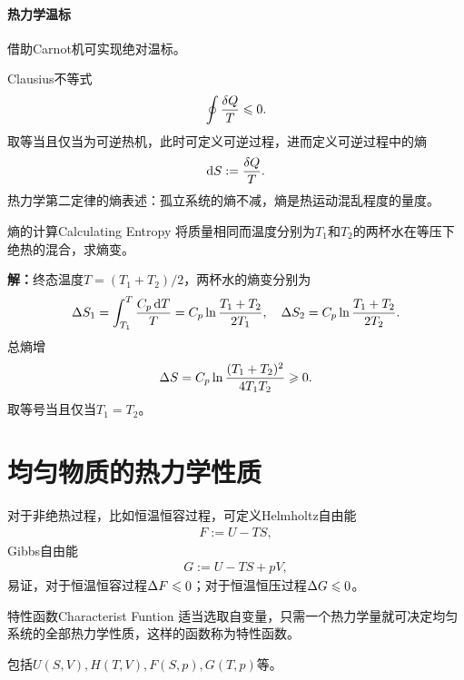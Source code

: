 \paragraph*{热力学温标}借助Carnot机可实现绝对温标。

Clausius不等式
\begin{align}
	\oint\frac{\mathop{}\!\delta Q}T\leqslant 0.
\end{align}
取等当且仅当为可逆热机，此时可定义可逆过程，进而定义可逆过程中的熵
\begin{align}
	\mathop{}\!\mathrm{d} S:=\frac{\mathop{}\!\delta Q}T.
\end{align}
热力学第二定律的熵表述：孤立系统的熵不减，熵是热运动混乱程度的量度。
\begin{example}{熵的计算}{Calculating Entropy}
	将质量相同而温度分别为$T_1$和$T_2$的两杯水在等压下绝热的混合，求熵变。

	\textbf{解：}终态温度$T=(T_1+T_2)/2$，两杯水的熵变分别为
	\[\Delta S_1=\int_{T_1}^T\frac{C_p\mathop{}\!\mathrm{d} T}T=C_p\ln\frac{T_1+T_2}{2T_1},\quad\Delta S_2=C_p\ln\frac{T_1+T_2}{2T_2}.\]
	总熵增
	\[\Delta S=C_p\ln\frac{(T_1+T_2)^2}{4T_1T_2}\geqslant 0.\]
	取等号当且仅当$T_1=T_2$。
\end{example}

\clearpage
\section{均匀物质的热力学性质}
对于非绝热过程，比如恒温恒容过程，可定义Helmholtz自由能
\begin{align}
	F:=U-TS,
\end{align}
Gibbs自由能
\begin{align}
	G:=U-TS+pV,
\end{align}
易证，对于恒温恒容过程$\Delta F\leqslant 0$；对于恒温恒压过程$\Delta G\leqslant 0$。
\begin{definition}{特性函数}{Characterist Funtion}
	适当选取自变量，只需一个热力学量就可决定均匀系统的全部热力学性质，这样的函数称为特性函数。
	
	包括$U(S,V),H(T,V),F(S,p),G(T,p)$等。
\end{definition}
